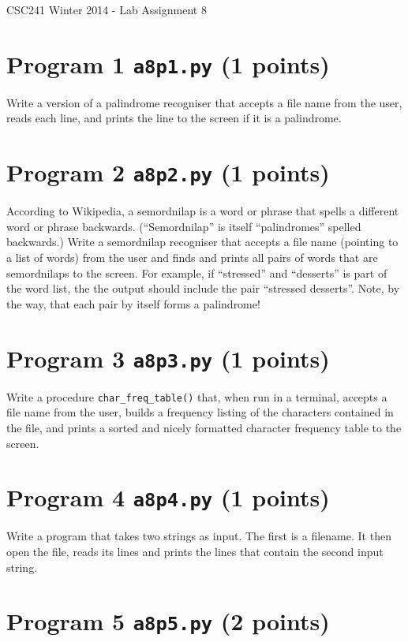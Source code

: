 \documentclass[12pt]{article}
\begin{document}
{\Large CSC241 Winter 2014 - Lab Assignment 8}

\section{Program 1 {\tt a8p1.py} (1 points)}

Write a version of a palindrome recogniser that accepts a file name from the user, reads each line, and prints the line to the screen if it is a palindrome. 

\section{Program 2 {\tt a8p2.py} (1 points)}

According to Wikipedia, a semordnilap is a word or phrase that spells a different word or phrase backwards. (``Semordnilap'' is itself ``palindromes'' spelled backwards.) Write a semordnilap recogniser that accepts a file name (pointing to a list of words) from the user and finds and prints all pairs of words that are semordnilaps to the screen. For example, if ``stressed'' and ``desserts'' is part of the word list, the the output should include the pair ``stressed desserts''. Note, by the way, that each pair by itself forms a palindrome!

\section{Program 3 {\tt a8p3.py} (1 points)}

Write a procedure {\tt char\_freq\_table()} that, when run in a terminal, accepts a file name from the user, builds a frequency listing of the characters contained in the file, and prints a sorted and nicely formatted character frequency table to the screen.

\section{Program 4 {\tt a8p4.py} (1 points)}

Write a program that takes two strings as input. The first is a filename. It then open the file, reads its lines and prints the lines that contain the second input string.

\section{Program 5 {\tt a8p5.py} (2 points)}
\end{document}
